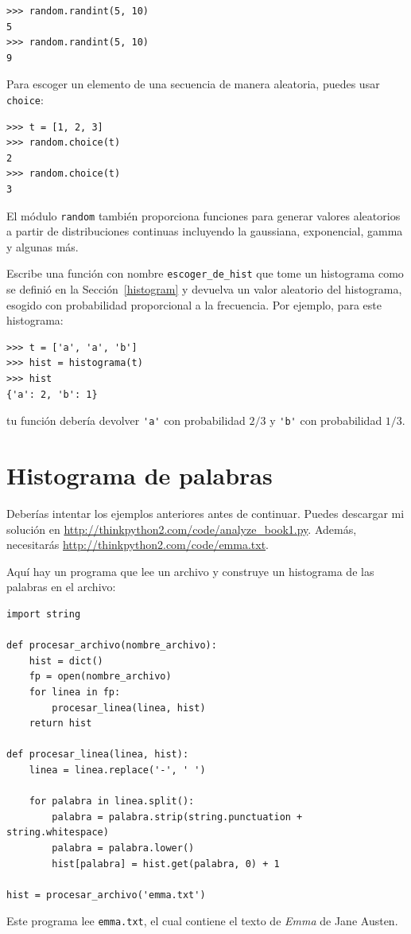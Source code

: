 \documentclass[10pt]{book}
\begin{document}
\begin{verbatim}
>>> random.randint(5, 10)
5
>>> random.randint(5, 10)
9
\end{verbatim}
%
Para escoger un elemento de una secuencia de manera aleatoria, puedes usar
{\tt choice}:

\begin{verbatim}
>>> t = [1, 2, 3]
>>> random.choice(t)
2
>>> random.choice(t)
3
\end{verbatim}
%
El módulo {\tt random} también proporciona funciones para generar
valores aleatorios a partir de distribuciones continuas incluyendo
la gaussiana, exponencial, gamma y algunas más.

\begin{exercise}

Escribe una función con nombre \verb"escoger_de_hist" que tome
un histograma como se definió en la Sección~\ref{histogram} y devuelva un
valor aleatorio del histograma, esogido con probabilidad
proporcional a la frecuencia.  Por ejemplo, para este histograma:

\begin{verbatim}
>>> t = ['a', 'a', 'b']
>>> hist = histograma(t)
>>> hist
{'a': 2, 'b': 1}
\end{verbatim}
%
tu función debería devolver \verb"'a'" con probabilidad $2/3$ y \verb"'b'"
con probabilidad $1/3$.
\end{exercise}


\section{Histograma de palabras}

Deberías intentar los ejemplos anteriores antes de continuar.
Puedes descargar mi solución en
 \url{http://thinkpython2.com/code/analyze_book1.py}.  Además,
necesitarás \url{http://thinkpython2.com/code/emma.txt}.

Aquí hay un programa que lee un archivo y construye un histograma de las
palabras en el archivo:

\begin{verbatim}
import string

def procesar_archivo(nombre_archivo):
    hist = dict()
    fp = open(nombre_archivo)
    for linea in fp:
        procesar_linea(linea, hist)
    return hist

def procesar_linea(linea, hist):
    linea = linea.replace('-', ' ')

    for palabra in linea.split():
        palabra = palabra.strip(string.punctuation + string.whitespace)
        palabra = palabra.lower()
        hist[palabra] = hist.get(palabra, 0) + 1

hist = procesar_archivo('emma.txt')
\end{verbatim}
%
Este programa lee {\tt emma.txt}, el cual contiene el texto de {\em
  Emma} de Jane Austen.
\end{document}
